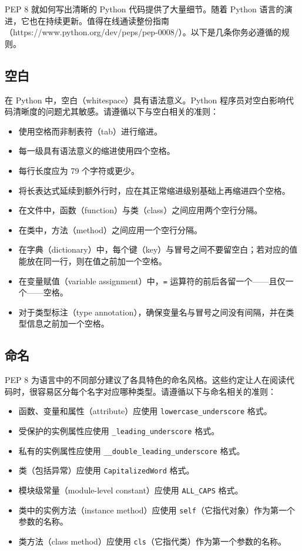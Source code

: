 PEP 8 就如何写出清晰的 Python 代码提供了大量细节。随着 Python 语言的演进，它也在持续更新。值得在线通读整份指南（https://www.python.org/dev/peps/pep-0008/）。以下是几条你务必遵循的规则。

\subsection{空白}

在 Python 中，空白（whitespace）具有语法意义。Python 程序员对空白影响代码清晰度的问题尤其敏感。请遵循以下与空白相关的准则：

\begin{itemize}
\item 使用空格而非制表符（tab）进行缩进。
\item 每一级具有语法意义的缩进使用四个空格。
\item 每行长度应为 79 个字符或更少。
\item 将长表达式延续到额外行时，应在其正常缩进级别基础上再缩进四个空格。
\item 在文件中，函数（function）与类（class）之间应用两个空行分隔。
\item 在类中，方法（method）之间应用一个空行分隔。
\item 在字典（dictionary）中，每个键（key）与冒号之间不要留空白；若对应的值能放在同一行，则在值之前加一个空格。
\item 在变量赋值（variable assignment）中，\texttt{=} 运算符的前后各留一个——且仅一个——空格。
\item 对于类型标注（type annotation），确保变量名与冒号之间没有间隔，并在类型信息之前加一个空格。
\end{itemize}

\subsection{命名}

PEP 8 为语言中的不同部分建议了各具特色的命名风格。这些约定让人在阅读代码时，很容易区分每个名字对应哪种类型。请遵循以下与命名相关的准则：

\begin{itemize}
\item 函数、变量和属性（attribute）应使用 \texttt{lowercase\_underscore} 格式。
\item 受保护的实例属性应使用 \texttt{\_leading\_underscore} 格式。
\item 私有的实例属性应使用 \texttt{\_\_double\_leading\_underscore} 格式。
\item 类（包括异常）应使用 \texttt{CapitalizedWord} 格式。
\item 模块级常量（module-level constant）应使用 \texttt{ALL\_CAPS} 格式。
\item 类中的实例方法（instance method）应使用 \texttt{self}（它指代对象）作为第一个参数的名称。
\item 类方法（class method）应使用 \texttt{cls}（它指代类）作为第一个参数的名称。
\end{itemize}

